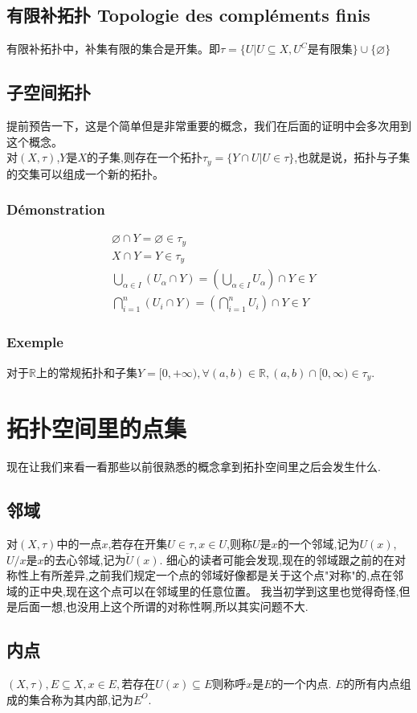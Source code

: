 \documentclass[12pt, a4paper, oneside]{ctexbook}
\begin{document}
  \subsection{有限补拓扑 Topologie des compléments finis}
  有限补拓扑中，补集有限的集合是开集。即$\tau=\{U|U\subseteq X,U^C\text{是有限集} \}\cup \{\varnothing\}$

  \subsection{子空间拓扑}\label{myref:子空间拓扑}
  提前预告一下，这是个简单但是非常重要的概念，我们在后面的证明中会多次用到这个概念。\\
  对$(X,\tau)$,$Y$是$X$的子集,则存在一个拓扑$\tau_y=\{Y\cap U| U\in\tau\}$,也就是说，拓扑与子集的交集可以组成一个新的拓扑。
  \subsubsection{Démonstration}
  $$
  \begin{aligned}&
  \varnothing\cap Y=\varnothing\in\tau_y\\&
  X\cap Y=Y\in\tau_y\\&
  \bigcup_{\alpha\in I}(U_\alpha\cap Y)=(\bigcup_{\alpha\in I}U_\alpha)\cap Y\in Y\\&
  \bigcap^n_{i=1}(U_i\cap Y)=( \bigcap^n_{i=1}U_i)\cap Y\in Y
  \end{aligned}
  $$
  \subsubsection{Exemple}
  对于$\mathbb{R}$上的常规拓扑和子集$Y=[0,+\infty),\forall (a,b)\in\mathbb{R},(a,b)\cap[0,\infty)\in\tau_y$.
\section{拓扑空间里的点集}
  现在让我们来看一看那些以前很熟悉的概念拿到拓扑空间里之后会发生什么.
  \subsection{邻域}
  对$(X,\tau)$中的一点$x$,若存在开集$U\in\tau, x\in U$,则称$U$是$x$的一个邻域,记为$U(x)$,$U/x$是$x$的去心邻域,记为$\check{U}(x) $.
  细心的读者可能会发现,现在的邻域跟之前的在对称性上有所差异,之前我们规定一个点的邻域好像都是关于这个点"对称"的,点在邻域的正中央,现在这个点可以在邻域里的任意位置。
  我当初学到这里也觉得奇怪,但是后面一想,也没用上这个所谓的对称性啊,所以其实问题不大.
  \subsection{内点}
  $(X,\tau), E\subseteq X,x\in E,\text{若存在} U(x)\subseteq E$则称呼$x$是$E$的一个内点. $E$的所有内点组成的集合称为其内部,记为$E^O$.
\end{document}
